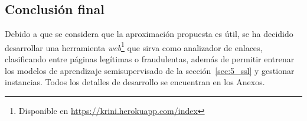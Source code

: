 \subsection{Conclusión final}

Debido a que se considera que la aproximación propuesta es útil, se ha decidido desarrollar una herramienta \textit{web}\footnote{Disponible en \url{https://krini.herokuapp.com/index}} que sirva como analizador de enlaces, clasificando entre páginas legítimas o fraudulentas, además de permitir entrenar los modelos de aprendizaje semisupervisado de la sección~\ref{sec:5_ssl} y gestionar instancias. Todos los detalles de desarrollo se encuentran en los Anexos.